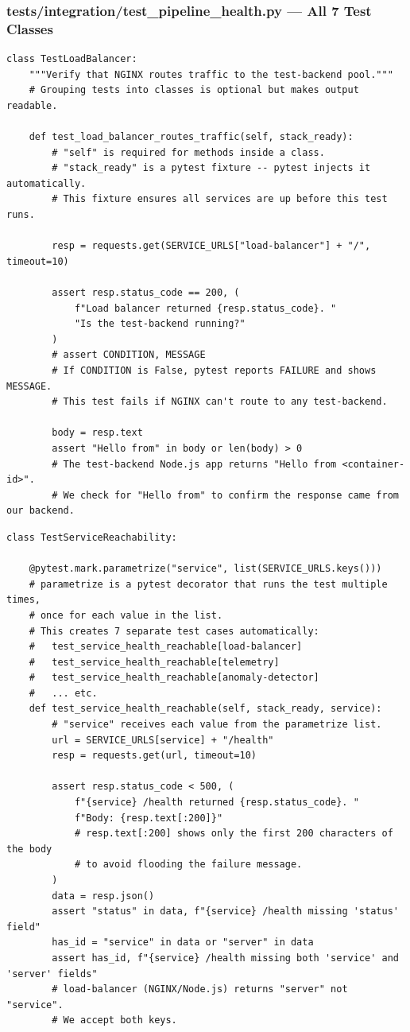\documentclass[12pt, a4paper]{article}
\begin{document}
\subsubsection{tests/integration/test\_pipeline\_health.py --- All 7 Test Classes}

\begin{lstlisting}[style=python, caption={test\_pipeline\_health.py --- Layer 1: HTTP Traffic}]
class TestLoadBalancer:
    """Verify that NGINX routes traffic to the test-backend pool."""
    # Grouping tests into classes is optional but makes output readable.

    def test_load_balancer_routes_traffic(self, stack_ready):
        # "self" is required for methods inside a class.
        # "stack_ready" is a pytest fixture -- pytest injects it automatically.
        # This fixture ensures all services are up before this test runs.

        resp = requests.get(SERVICE_URLS["load-balancer"] + "/", timeout=10)

        assert resp.status_code == 200, (
            f"Load balancer returned {resp.status_code}. "
            "Is the test-backend running?"
        )
        # assert CONDITION, MESSAGE
        # If CONDITION is False, pytest reports FAILURE and shows MESSAGE.
        # This test fails if NGINX can't route to any test-backend.

        body = resp.text
        assert "Hello from" in body or len(body) > 0
        # The test-backend Node.js app returns "Hello from <container-id>".
        # We check for "Hello from" to confirm the response came from our backend.
\end{lstlisting}

\begin{lstlisting}[style=python, caption={test\_pipeline\_health.py --- Layer 2: Service Reachability}]
class TestServiceReachability:

    @pytest.mark.parametrize("service", list(SERVICE_URLS.keys()))
    # parametrize is a pytest decorator that runs the test multiple times,
    # once for each value in the list.
    # This creates 7 separate test cases automatically:
    #   test_service_health_reachable[load-balancer]
    #   test_service_health_reachable[telemetry]
    #   test_service_health_reachable[anomaly-detector]
    #   ... etc.
    def test_service_health_reachable(self, stack_ready, service):
        # "service" receives each value from the parametrize list.
        url = SERVICE_URLS[service] + "/health"
        resp = requests.get(url, timeout=10)

        assert resp.status_code < 500, (
            f"{service} /health returned {resp.status_code}. "
            f"Body: {resp.text[:200]}"
            # resp.text[:200] shows only the first 200 characters of the body
            # to avoid flooding the failure message.
        )
        data = resp.json()
        assert "status" in data, f"{service} /health missing 'status' field"
        has_id = "service" in data or "server" in data
        assert has_id, f"{service} /health missing both 'service' and 'server' fields"
        # load-balancer (NGINX/Node.js) returns "server" not "service".
        # We accept both keys.
\end{lstlisting}
\end{document}
